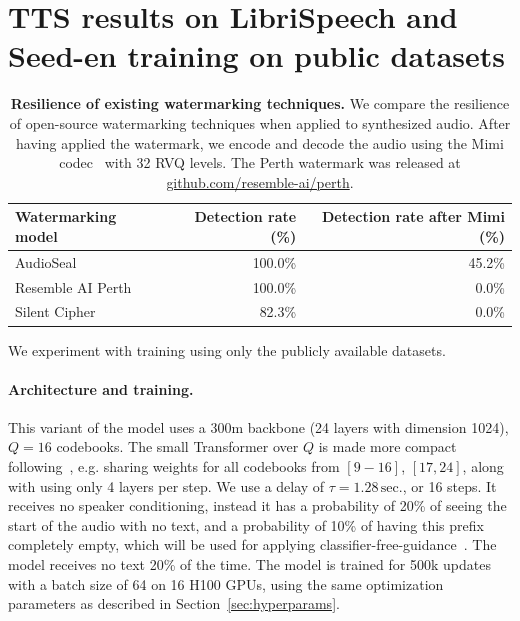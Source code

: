 \section{TTS results on LibriSpeech and Seed-en training on public datasets}
\label{app:sec:libri_seed}

\begin{table}
\centering
\caption{\textbf{Resilience of existing watermarking techniques.} 
We compare the resilience of open-source watermarking techniques when applied to synthesized audio.
After having applied the watermark, we encode and decode the audio using the Mimi codec~\citep{moshi} with 32 RVQ levels.
The Perth watermark was released at \href{https://github.com/resemble-ai/perth}{github.com/resemble-ai/perth}.}
\label{tab:watermark}
\begin{tabular}{l|rr}
\toprule
\textbf{Watermarking model} & \textbf{Detection rate} (\%) & \textbf{Detection rate after Mimi} (\%)\\
\midrule
AudioSeal~\citep{sanroman2024proactive} & 100.0\% & 45.2\%\\
Resemble AI Perth & 100.0\% & 0.0\%\\
Silent Cipher~\citep{singh24_interspeech} & 82.3\% & 0.0\%\\
\bottomrule
\end{tabular}
\end{table}


We experiment with training \oursTTS{} using only the publicly available datasets. 

\paragraph{Architecture and training.} This variant of the model uses a 300m backbone (24 layers with dimension 1024), $Q=16$ codebooks. The small Transformer over $Q$ is made more compact following~\citep{hibiki}, e.g. sharing weights for all codebooks from $[9-16]$, $[17, 24]$, along with using only 4 layers per  step. We use a delay of $\tau=1.28\,\text{sec.}$, or 16 steps.
It receives no speaker conditioning, instead it has a probability of 20\% of seeing the start of the audio with no text, and a probability of 10\% of having this prefix completely empty, which will be used for applying classifier-free-guidance~\citep{ho2022classifier,audiogen}. The model receives no text 20\% of the time.
The model is trained for 500k updates with a batch size of 64 on 16 H100 GPUs, using the same optimization parameters as described in Section~\ref{sec:hyperparams}.

